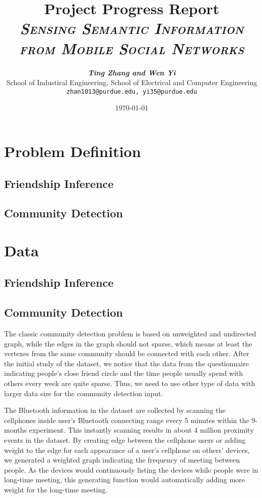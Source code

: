 \documentclass[11pt]{article}
\title{
\textbf{Project Progress Report} \\ \textsc{\textit{Sensing Semantic Information from Mobile Social Networks}} \\
}
\author{
	\textbf{\textit{Ting Zhang and Wen Yi}} \\
	School of Industiral Engineering, School of Electrical and Computer Engineering\\
	\texttt{zhan1013@purdue.edu, yi35@purdue.edu}
}
\date{\today}
\begin{document}
\maketitle


\section{Problem Definition}
\subsection{Friendship Inference}

\subsection{Community Detection}

\section{Data}
\subsection{Friendship Inference}

\subsection{Community Detection}
The classic community detection problem is based on unweighted and undirected graph, while the edges in the graph should not sparse, which means at least the vertexes from the same community should be connected with each other. 
After the initial study of the dataset, we notice that the data from the questionnaire indicating people's close friend circle and the time people usually spend with others every week are quite sparse. Thus, we need to use other type of data with larger data size for the community detection input.

The Bluetooth information in the dataset are collected by scanning the cellphones inside user's Bluetooth connecting range every 5 minutes within the 9-months experiment. This instantly scanning results in about 4 million proximity events in the dataset. By creating edge between the cellphone users or adding weight to the edge for each appearance of a user's cellphone on others' devices, we generated a weighted graph indicating the frequency of meeting between people. As the devices would continuously listing the devices while people were in long-time meeting, this generating function would automatically adding more weight for the long-time meeting.
\end{document}
